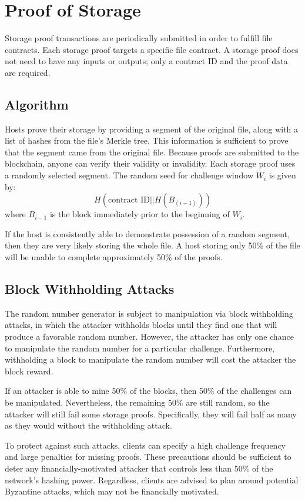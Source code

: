 \documentclass[twocolumn]{article}
\begin{document}
\section{Proof of Storage}
\label{sec:storage}
Storage proof transactions are periodically submitted in order to fulfill file contracts.
Each storage proof targets a specific file contract.
A storage proof does not need to have any inputs or outputs; only a contract ID and the proof data are required.

\subsection{Algorithm}
Hosts prove their storage by providing a segment of the original file, along with a list of hashes from the file's Merkle tree.
This information is sufficient to prove that the segment came from the original file.
Because proofs are submitted to the blockchain, anyone can verify their validity or invalidity.
Each storage proof uses a randomly selected segment.
The random seed for challenge window $W_i$ is given by:
\[
	H(\text{contract ID} || H(B_(i-1)))
\]
where $B_{i-1}$ is the block immediately prior to the beginning of $W_i$.

If the host is consistently able to demonstrate possession of a random segment, then they are very likely storing the whole file.
A host storing only 50\% of the file will be unable to complete approximately 50\% of the proofs.

\subsection{Block Withholding Attacks}
The random number generator is subject to manipulation via block withholding attacks, in which the attacker withholds blocks until they find one that will produce a favorable random number.
However, the attacker has only one chance to manipulate the random number for a particular challenge.
Furthermore, withholding a block to manipulate the random number will cost the attacker the block reward.

If an attacker is able to mine 50\% of the blocks, then 50\% of the challenges can be manipulated.
Nevertheless, the remaining 50\% are still random, so the attacker will still fail some storage proofs.
Specifically, they will fail half as many as they would without the withholding attack.

To protect against such attacks, clients can specify a high challenge frequency and large penalties for missing proofs.
These precautions should be sufficient to deter any financially-motivated attacker that controls less than 50\% of the network's hashing power.
Regardless, clients are advised to plan around potential Byzantine attacks, which may not be financially motivated.
\end{document}
